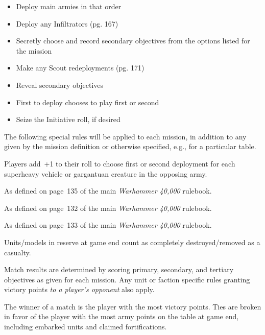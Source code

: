 \documentclass{40k}
\begin{document}
\begin{multicols}{2}
\begin{itemize}
\item Deploy main armies in that order

\item Deploy any Infiltrators (pg. 167)

\item Secretly choose and record secondary objectives from the options
  listed for the mission

\item Make any Scout redeployments (pg. 171)

\item Reveal secondary objectives

\item First to deploy chooses to play first or second

\item Seize the Initiative roll, if desired

\end{itemize}

\columnbreak

%

The following special rules will be applied to each mission, in
addition to any given by the mission definition or otherwise
specified, e.g., for a particular table.

  Players add~+1 to their roll to
choose first or second deployment for each superheavy vehicle or
gargantuan creature in the opposing army.

 As defined on page~135 of the main
\emph{Warhammer 40,000} rulebook.

 As defined on page~132 of
the main \emph{Warhammer 40,000} rulebook.

 As defined on page~133 of
the main \emph{Warhammer 40,000} rulebook.

  Units/models in reserve at game end count
as completely destroyed/removed as a casualty.

%

Match results are determined by scoring primary, secondary, and
tertiary objectives as given for each mission.  Any unit or faction
specific rules granting victory points \emph{to a player's opponent}
also apply.

The winner of a match is the player with the most victory points.
Ties are broken in favor of the player with the most army points on
the table at game end, including embarked units and claimed
fortifications.


\end{multicols}
\end{document}
